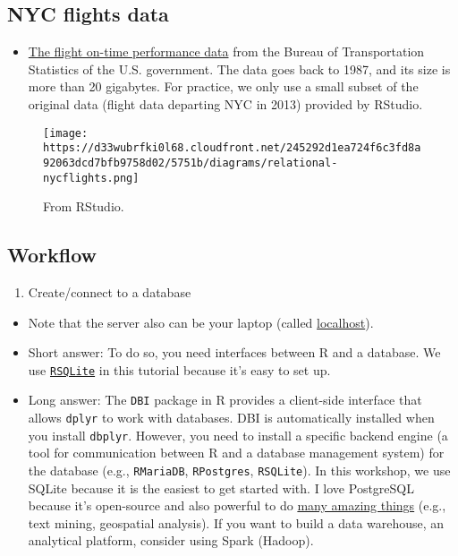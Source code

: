 \documentclass[
]{book}
\providecommand{\tightlist}{%
  \setlength{\itemsep}{0pt}\setlength{\parskip}{0pt}}
\begin{document}
\hypertarget{nyc-flights-data}{%
\subsection{NYC flights data}\label{nyc-flights-data}}

\begin{itemize}
\tightlist
\item
  \href{https://www.transtats.bts.gov/DL_SelectFields.asp?Table_ID=236}{The flight on-time performance data} from the Bureau of Transportation Statistics of the U.S. government. The data goes back to 1987, and its size is more than 20 gigabytes. For practice, we only use a small subset of the original data (flight data departing NYC in 2013) provided by RStudio.
\end{itemize}

\begin{figure}
\centering
\texttt{[image: https://d33wubrfki0l68.cloudfront.net/245292d1ea724f6c3fd8a92063dcd7bfb9758d02/5751b/diagrams/relational-nycflights.png]}
\caption{From RStudio.}
\end{figure}

\hypertarget{workflow-4}{%
\subsection{Workflow}\label{workflow-4}}

\begin{enumerate}
\def\labelenumi{\arabic{enumi}.}
\tightlist
\item
  Create/connect to a database
\end{enumerate}

\begin{itemize}
\item
  Note that the server also can be your laptop (called \href{https://en.wikipedia.org/wiki/Localhost\#:~:text=In\%20computer\%20networking\%2C\%20localhost\%20is,via\%20the\%20loopback\%20network\%20interface.}{localhost}).
\item
  Short answer: To do so, you need interfaces between R and a database. We use \href{https://github.com/r-dbi/RSQLite}{\texttt{RSQLite}} in this tutorial because it's easy to set up.
\item
  Long answer: The \texttt{DBI} package in R provides a client-side interface that allows \texttt{dplyr} to work with databases. DBI is automatically installed when you install \texttt{dbplyr}. However, you need to install a specific backend engine (a tool for communication between R and a database management system) for the database (e.g., \texttt{RMariaDB}, \texttt{RPostgres}, \texttt{RSQLite}). In this workshop, we use SQLite because it is the easiest to get started with. I love PostgreSQL because it's open-source and also powerful to do \href{https://www.postgresql.org/docs/current/functions.html}{many amazing things} (e.g., text mining, geospatial analysis). If you want to build a data warehouse, an analytical platform, consider using Spark (Hadoop).
\end{itemize}
\end{document}
